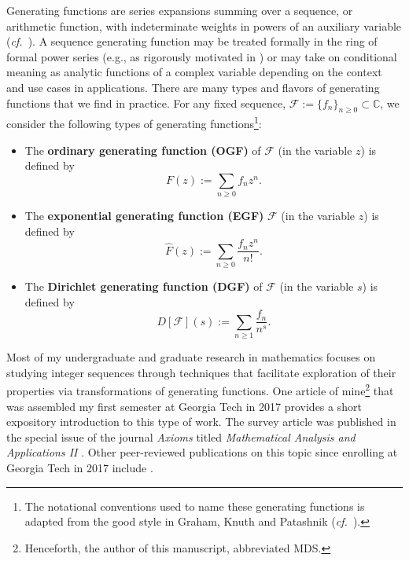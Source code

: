 \documentclass[12pt,reqno,a4letter]{article}
\numberwithin{figure}{section}
\numberwithin{table}{section}
\numberwithin{equation}{section}
\newcommand{\cf}{\textit{cf.~}}
\theoremstyle{plain}
\numberwithin{theorem}{section}
\theoremstyle{definition}
\begin{document}
Generating functions are series expansions summing over a sequence, or arithmetic function, 
with indeterminate weights in powers of an auxiliary variable 
\cite[\S 1]{GFOLOGY} (\cf \cite{ECV1,ECV2,LANDO-GFLECT,ACOMB-BOOK,RIORDAN-COMBIDENTS,ADVCOMB}). 
A sequence generating function may be treated formally in the ring of formal power series 
(e.g., as rigorously motivated in \cite{REZNICK-STERN-NOTES}) or may take on conditional 
meaning as analytic functions of 
a complex variable depending on the context and use cases in applications. 
There are many types and flavors 
of generating functions that we find in practice. 
For any fixed sequence, $\mathcal{F} := \{f_n\}_{n \geq 0} \subset \mathbb{C}$, 
we consider the following types of generating functions\footnote{
    The notational conventions used to name these generating functions is adapted 
    from the good style in Graham, Knuth and Patashnik \cite[\cf \S 7]{GKP} 
    (\cf \cite{KNUTHNOTATION}). 
}:
\begin{itemize}
\item The \textbf{ordinary generating function (OGF)} of $\mathcal{F}$ (in the variable $z$) 
	is defined by 
	\[
	F(z) := \sum_{n \geq 0} f_n z^n. 
	\]
\item The \textbf{exponential generating function (EGF)} $\mathcal{F}$ (in the variable $z$) 
	is defined by 
	\[
	\widehat{F}(z) := \sum_{n \geq 0} \frac{f_n z^n}{n!}. 
	\]
\item The \textbf{Dirichlet generating function (DGF)} 
	of $\mathcal{F}$ (in the variable $s$) 
	is defined by 
	\[
	D[\mathcal{F}](s) := \sum_{n \geq 1} \frac{f_n}{n^s}. 
	\]
\end{itemize}
Most of my undergraduate and graduate research in mathematics 
focuses on studying integer sequences through 
techniques that facilitate exploration of their properties via 
transformations of generating functions. 
One article of mine\footnote{
	Henceforth, the author of this manuscript, abbreviated MDS. 
}
that was assembled my first semester at 
Georgia Tech in 2017 provides a short expository introduction to this type of work. 
The survey article was published in the special issue of the journal \emph{Axioms} titled 
\emph{Mathematical Analysis and Applications II}
\cite{MDS-GFSURVEY}. 
Other peer-reviewed publications on this topic since 
enrolling at Georgia Tech in 2017 include 
\cite{MDS-OJAC-V1,MDS-OJAC-V2,MDS-SQUARE-SERIES-GFTRANS,SCHMIDT-SODFORMULAS,MDS-COMBRESTRDIVSUMS-INTEGERS}. 
\end{document}
